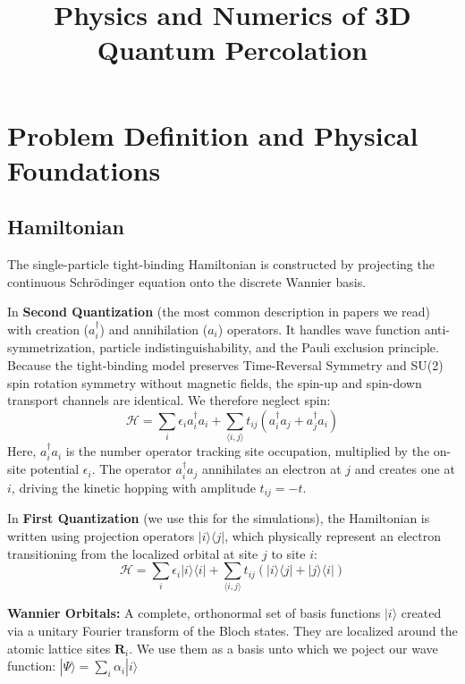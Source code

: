 \documentclass[11pt,a4paper]{article}
\title{Physics and Numerics of 3D Quantum Percolation}
\author{}
\date{}
\begin{document}
\maketitle

\section{Problem Definition and Physical Foundations}

\subsection{Hamiltonian}

The single-particle tight-binding Hamiltonian is constructed by projecting the continuous Schrödinger equation onto the discrete Wannier basis. 

In \textbf{Second Quantization} (the most common description in papers we read) with creation ($a_i^\dagger$) and annihilation ($a_i$) operators. It handles wave function anti-symmetrization, particle indistinguishability, and the Pauli exclusion principle. Because the tight-binding model preserves Time-Reversal Symmetry and SU(2) spin rotation symmetry without magnetic fields, the spin-up and spin-down transport channels are identical. We therefore neglect spin:
\begin{equation}
\mathcal{H} = \sum_{i} \epsilon_i a_i^\dagger a_i + \sum_{\langle i,j \rangle} t_{ij} \left( a_i^\dagger a_j + a_j^\dagger a_i \right)
\end{equation}
Here, $a_i^\dagger a_i$ is the number operator tracking site occupation, multiplied by the on-site potential $\epsilon_i$. The operator $a_i^\dagger a_j$ annihilates an electron at $j$ and creates one at $i$, driving the kinetic hopping with amplitude $t_{ij} = -t$.

In \textbf{First Quantization} (we use this for the simulations), the Hamiltonian is written using projection operators $|i\rangle\langle j|$, which physically represent an electron transitioning from the localized orbital at site $j$ to site $i$:
\begin{equation}
\mathcal{H} = \sum_{i} \epsilon_i |i\rangle\langle i| + \sum_{\langle i,j \rangle} t_{ij} \left( |i\rangle\langle j| + |j\rangle\langle i| \right)
\end{equation}

\textbf{Wannier Orbitals:} A complete, orthonormal set of basis functions $|i\rangle$ created via a unitary Fourier transform of the Bloch states. They are localized around the atomic lattice sites $\mathbf{R}_i$. We use them as a basis unto which we poject our wave function: $|\Psi\rangle = \sum_i \alpha_i |i\rangle$
\end{document}
